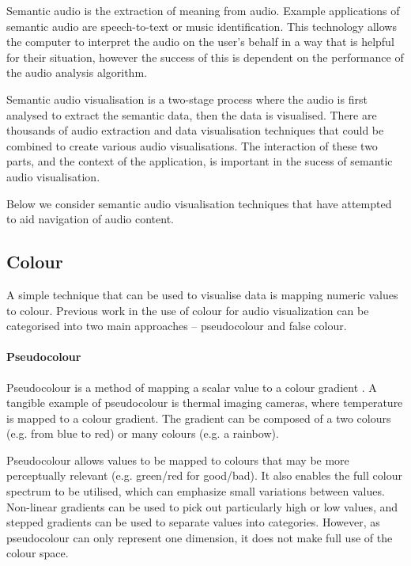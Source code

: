 Semantic audio is the extraction of meaning from audio. Example applications of semantic audio are speech-to-text or
music identification. This technology allows the computer to interpret the audio on the user's behalf in a way that is
helpful for their situation, however the success of this is dependent on the performance of the audio analysis
algorithm.

Semantic audio visualisation is a two-stage process where the audio is first analysed to extract the semantic data,
then the data is visualised. There are thousands of audio extraction and data visualisation techniques that could
be combined to create various audio visualisations. The interaction of these two parts, and the context of the
application, is important in the sucess of semantic audio visualisation. 

Below we consider semantic audio visualisation techniques that have attempted to aid navigation of audio content.



\subsection{Colour}\label{sec:background-colour} A simple technique that can be used to visualise data is mapping
numeric values to colour.  Previous work in the use of colour for audio visualization can be categorised into two main
approaches -- pseudocolour and false colour.

\paragraph{Pseudocolour}\label{sec:background-pseudocolour} Pseudocolour is a method of mapping a scalar value to a
colour gradient \citep{Moreland2009}.  A tangible example of pseudocolour is thermal imaging cameras, where temperature
is mapped to a colour gradient.  The gradient can be composed of a two colours (e.g. from blue to red) or many colours
(e.g. a rainbow).

Pseudocolour allows values to be mapped to colours that may be more perceptually relevant (e.g. green/red for
good/bad).  It also enables the full colour spectrum to be utilised, which can emphasize small variations between
values.  Non-linear gradients can be used to pick out particularly high or low values, and stepped gradients can be
used to separate values into categories.  However, as pseudocolour can only represent one dimension, it does not make
full use of the colour space.

